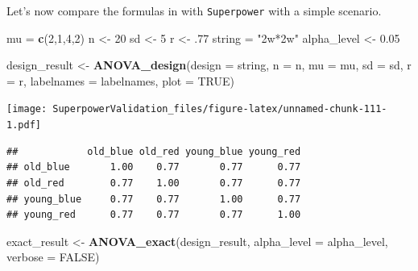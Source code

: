 \documentclass[
]{book}
\newenvironment{Shaded}{\begin{snugshade}}{\end{snugshade}}
\newcommand{\DataTypeTok}[1]{\textcolor[rgb]{0.13,0.29,0.53}{#1}}
\newcommand{\DecValTok}[1]{\textcolor[rgb]{0.00,0.00,0.81}{#1}}
\newcommand{\FloatTok}[1]{\textcolor[rgb]{0.00,0.00,0.81}{#1}}
\newcommand{\KeywordTok}[1]{\textcolor[rgb]{0.13,0.29,0.53}{\textbf{#1}}}
\newcommand{\NormalTok}[1]{#1}
\newcommand{\OperatorTok}[1]{\textcolor[rgb]{0.81,0.36,0.00}{\textbf{#1}}}
\newcommand{\OtherTok}[1]{\textcolor[rgb]{0.56,0.35,0.01}{#1}}
\newcommand{\StringTok}[1]{\textcolor[rgb]{0.31,0.60,0.02}{#1}}
\begin{document}
Let's now compare the formulas in \citet{potvin2000statistical} with \texttt{Superpower} with a simple scenario.

\begin{Shaded}
\begin{Highlighting}[]
\NormalTok{mu =}\StringTok{ }\KeywordTok{c}\NormalTok{(}\DecValTok{2}\NormalTok{,}\DecValTok{1}\NormalTok{,}\DecValTok{4}\NormalTok{,}\DecValTok{2}\NormalTok{) }
\NormalTok{n <-}\StringTok{ }\DecValTok{20}
\NormalTok{sd <-}\StringTok{ }\DecValTok{5}
\NormalTok{r <-}\StringTok{ }\FloatTok{.77}
\NormalTok{string =}\StringTok{ "2w*2w"}
\NormalTok{alpha_level <-}\StringTok{ }\FloatTok{0.05}


\NormalTok{design_result <-}\StringTok{ }\KeywordTok{ANOVA_design}\NormalTok{(}\DataTypeTok{design =}\NormalTok{ string,}
                              \DataTypeTok{n =}\NormalTok{ n, }
                              \DataTypeTok{mu =}\NormalTok{ mu, }
                              \DataTypeTok{sd =}\NormalTok{ sd, }
                              \DataTypeTok{r =}\NormalTok{ r, }
                              \DataTypeTok{labelnames =}\NormalTok{ labelnames,}
                              \DataTypeTok{plot =} \OtherTok{TRUE}\NormalTok{)}
\end{Highlighting}
\end{Shaded}

\texttt{[image: SuperpowerValidation\_files/figure-latex/unnamed-chunk-111-1.pdf]}

\begin{Shaded}
\end{Shaded}

\begin{verbatim}
##            old_blue old_red young_blue young_red
## old_blue       1.00    0.77       0.77      0.77
## old_red        0.77    1.00       0.77      0.77
## young_blue     0.77    0.77       1.00      0.77
## young_red      0.77    0.77       0.77      1.00
\end{verbatim}

\begin{Shaded}
\begin{Highlighting}[]
\NormalTok{exact_result <-}\StringTok{ }\KeywordTok{ANOVA_exact}\NormalTok{(design_result,}
                            \DataTypeTok{alpha_level =}\NormalTok{ alpha_level,}
                            \DataTypeTok{verbose =} \OtherTok{FALSE}\NormalTok{)}
\end{Highlighting}
\end{Shaded}
\end{document}
